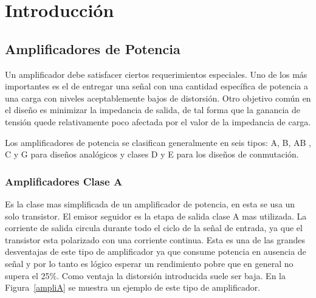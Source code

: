 \documentclass[a4paper,12pt,twoside]{article}
\begin{document}


\newpage
\vfill
\tableofcontents
\vfill

\newpage
\section{Introducción}
\subsection{Amplificadores de Potencia}

Un amplificador debe satisfacer ciertos requerimientos especiales. Uno de los más importantes es el de entregar una señal con una cantidad específica de potencia a una carga con niveles aceptablemente bajos de distorsión. Otro objetivo común en el diseño es minimizar la impedancia de salida, de tal forma que la ganancia de tensión quede relativamente poco afectada por el valor de la impedancia de carga.

Los amplificadores de potencia  se clasifican generalmente en seis tipos: A, B, AB , C y G para diseños analógicos y clases D y E para los diseños de conmutación. 



\subsubsection*{Amplificadores Clase A}

Es la clase mas simplificada de un amplificador de potencia, en esta se usa un solo transistor. El emisor seguidor es la etapa de salida clase A mas utilizada. La corriente de salida circula durante todo el ciclo de la señal de entrada, ya que el transistor esta polarizado con una corriente continua. Esta es una de las grandes desventajas de este tipo de amplificador ya que consume potencia en ausencia de señal y por lo tanto es lógico esperar un rendimiento pobre que en general no supera el 25\%. Como ventaja la distorsión introducida suele ser baja. En la Figura~\ref{ampliA} se muestra un ejemplo de este tipo de amplificador.
 
\end{document}
